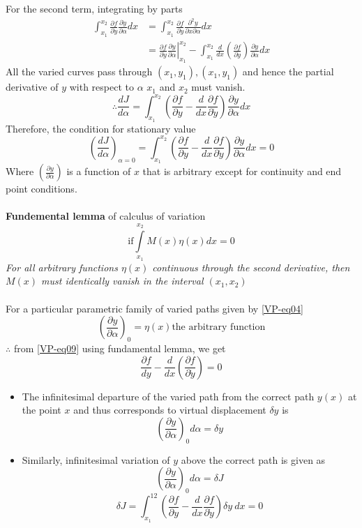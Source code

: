 	For the second term, integrating by parts\\
	\begin{align*}
		\int_{x_{1}}^{x_{2}} \frac{\partial f}{\partial \dot{y}} \frac{\partial \dot{y}}{\partial \alpha} d x&=\int_{x_{1}}^{x_{2}} \frac{\partial f}{\partial \dot{y}} \frac{\partial^{2} y}{\partial x \partial \alpha} d x\\
		&=\left.\frac{\partial f}{\partial \dot{y}} \frac{\partial y}{\partial \alpha}\right|_{x_{1}} ^{x_{2}}-\int_{x_{1}}^{x_{2}} \frac{d}{d x}\left(\frac{\partial f}{\partial \dot{y}}\right) \frac{\partial y}{\partial \alpha} d x
	\end{align*}
All the varied curves pass through $(x_1,y_1),(x_1,y_1)$ and hence the partial derivative of $y$ with respect to  $\alpha$ $x_1$ and $x_2$ must vanish.
\begin{equation}
\therefore \frac{d J}{d \alpha}=\int_{x_{1}}^{x_{2}}\left(\frac{\partial f}{\partial y}-\frac{d}{d x} \frac{\partial f}{\partial \dot{y}}\right) \frac{\partial y}{\partial \alpha} d x
\end{equation}
Therefore, the condition for stationary value
\begin{equation}
\left(\frac{dJ}{d\alpha} \right)_{\alpha=0} =\int_{x_{1}}^{x_{2}}\left(\frac{\partial f}{\partial y}-\frac{d}{d x} \frac{\partial f}{\partial \dot{y}}\right) \frac{\partial y}{\partial \alpha} d x=0\label{VP-eq09}
\end{equation}
Where $\left( \frac{\partial y}{\partial \alpha}\right) $ is a function of $x$ that is arbitrary except for continuity and end point conditions.\\\\
\textbf{Fundemental lemma} of calculus of variation
	\begin{equation}
	\text{if} \int\limits_{x_1}^{x_2}M(x)\eta(x)dx=0
	\end{equation}
	\textit{For all arbitrary functions $\eta (x)$ continuous through the second derivative, then $M(x)$ must identically vanish in the interval $(x_1,x_2)$}\\\\
	For a particular parametric family of varied paths given by \ref{VP-eq04}
	$$\left(\frac{\partial y}{\partial\alpha} \right)_0 =\eta(x)\text{the arbitrary function}$$
	$\therefore$ from \ref{VP-eq09} using fundamental lemma, we get 
	\begin{equation}
	\frac{\partial f}{dy}-\frac{d}{dx}\left( \frac{\partial f}{\partial\dot{y}}\right) =0
	\end{equation}
	\begin{itemize}
		\item The infinitesimal departure of the varied path from the correct path $y(x)$ at the point $x$ and thus corresponds to virtual displacement $\delta y$ is
		$$\left( \frac{\partial y}{\partial\alpha}\right)_0 d\alpha=\delta y$$
\item Similarly, infinitesimal variation of $y$ above the correct path is given as		
		$$\left( \frac{\partial y}{\partial\alpha}\right)_0 d\alpha=\delta J$$
		$$\delta J=\int_{x_{1}}^{12}\left(\frac{\partial f}{\partial y}-\frac{d}{d x} \frac{\partial f}{\partial \dot{y}}\right)\delta y\ dx=0$$
	\end{itemize}